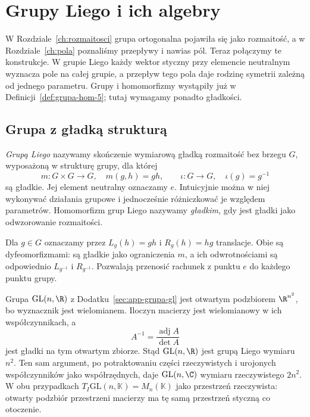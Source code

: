 \chapter{Grupy Liego i ich algebry}
\label{ch:grupy-liego}

W Rozdziale~\ref{ch:rozmaitosci} grupa ortogonalna pojawiła się jako
rozmaitość, a w Rozdziale~\ref{ch:pola} poznaliśmy przepływy i nawias pól.
Teraz połączymy te konstrukcje. W grupie Liego każdy wektor styczny
przy elemencie neutralnym wyznacza pole na całej grupie, a przepływ
tego pola daje rodzinę symetrii zależną od jednego parametru.
Grupy i homomorfizmy wystąpiły już w
Definicji~\ref{def:grupa-hom-5}; tutaj wymagamy ponadto gładkości.

\section{Grupa z gładką strukturą}
\label{sec:grupy-liego-przyklady}

\begin{definicja}
\label{def:grupa-liego}
\emph{Grupą Liego} nazywamy skończenie wymiarową gładką rozmaitość
bez brzegu $G$, wyposażoną w strukturę grupy, dla której
\[
 m:G\times G\longrightarrow G,\quad m(g,h)=gh,
 \qquad \iota:G\longrightarrow G,\quad\iota(g)=g^{-1}
\]
są gładkie. Jej element neutralny oznaczamy $e$.
Intuicyjnie można w niej wykonywać działania grupowe i jednocześnie
różniczkować je względem parametrów. Homomorfizm grup Liego nazywamy
\emph{gładkim}, gdy jest gładki jako odwzorowanie rozmaitości.
\end{definicja}

Dla $g\in G$ oznaczamy przez $L_g(h)=gh$ i $R_g(h)=hg$
translacje. Obie są dyfeomorfizmami: są gładkie jako ograniczenia
$m$, a ich odwrotnościami są odpowiednio $L_{g^{-1}}$ i
$R_{g^{-1}}$. Pozwalają przenosić rachunek z punktu $e$ do
każdego punktu grupy.

\begin{przyklad}
\label{prz:gl-liego}
Grupa $\mathrm{GL}(n,\R)$ z
Dodatku~\ref{sec:app-grupa-gl} jest otwartym podzbiorem
$\R^{n^2}$, bo wyznacznik jest wielomianem.
Iloczyn macierzy jest wielomianowy w ich współczynnikach, a
\[
 A^{-1}=\frac{\operatorname{adj}A}{\det A}
\]
jest gładki na tym otwartym zbiorze. Stąd $\mathrm{GL}(n,\R)$
jest grupą Liego wymiaru $n^2$. Ten sam argument, po potraktowaniu
części rzeczywistych i urojonych współczynników jako współrzędnych,
daje $\mathrm{GL}(n,\C)$ wymiaru rzeczywistego $2n^2$.
W obu przypadkach $T_I\mathrm{GL}(n,\mathbb K)=M_n(\mathbb K)$
jako przestrzeń rzeczywista: otwarty podzbiór przestrzeni macierzy
ma tę samą przestrzeń styczną co otoczenie.
\end{przyklad}

